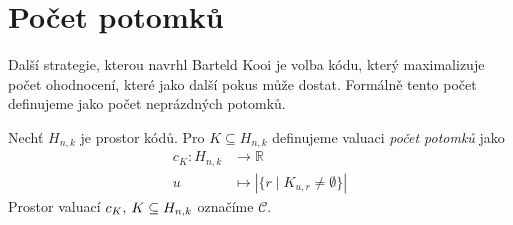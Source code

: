 












\section{Počet potomků}
Další strategie, kterou navrhl Barteld Kooi \cite{kooi} je volba kódu, který maximalizuje počet ohodnocení, které jako další pokus může dostat. Formálně tento počet definujeme jako počet neprázdných potomků.
\begin{definice}
    Nechť $H_{n,k}$ je prostor kódů. Pro $K \subseteq H_{n,k}$ definujeme valuaci \emph{počet potomků} jako
    \begin{align*}
        c_K \colon H_{n,k} &\to \mathbb{R} \\
        u &\mapsto |\{r \mid K_{u,r} \neq \emptyset\}|
    \end{align*}
    Prostor valuací $c_K, \hspace{2px} K \subseteq H_{n,k}$ označíme $\mathcal{C}$. 
\end{definice}

